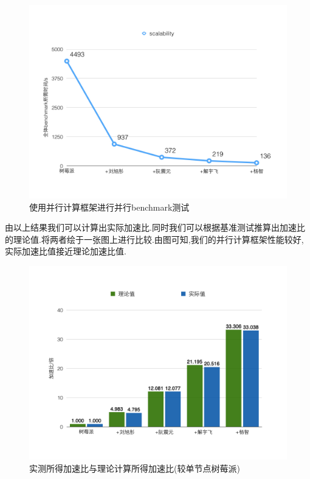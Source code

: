 \documentclass[paper=a4]{ctexart} %
\numberwithin{equation}{section} %
\numberwithin{figure}{section} %
\numberwithin{table}{section} %
\begin{document}
\begin{figure}[h*]
\centering
\includegraphics[width=\textwidth]{pic/graph003.jpg}
\caption{使用并行计算框架进行并行benchmark测试}
\end{figure}

由以上结果我们可以计算出实际加速比.同时我们可以根据基准测试推算出加速比的理论值.将两者绘于一张图上进行比较.由图可知,我们的并行计算框架性能较好,实际加速比值接近理论加速比值.

\begin{figure}[h*] 
\centering
\includegraphics[width=\textwidth]{pic/graph004.png}
\caption{实测所得加速比与理论计算所得加速比(较单节点树莓派)}
\end{figure}
\end{document}
